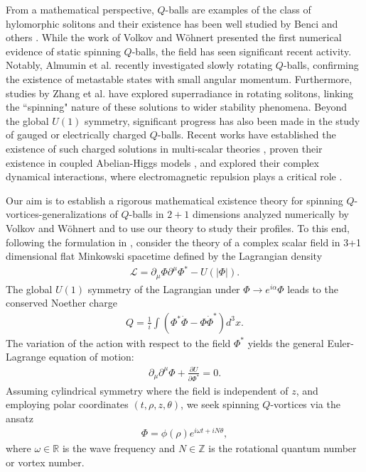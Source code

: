 \documentclass[12pt]{article}
\begin{document}
From a mathematical perspective, $Q$-balls are examples of the class of hylomorphic solitons and their existence has been well studied by Benci and others \cite{Benci3,Benci4,Benci5}. While the work of Volkov and W\"ohnert \cite{VW} presented the first numerical evidence of static spinning $Q$-balls, the field has seen significant recent activity. Notably, Almumin et al. \cite{Almumin2024} recently investigated slowly rotating $Q$-balls, confirming the existence of metastable states with small angular momentum. Furthermore, studies by Zhang et al. \cite{Zhang2025} have explored superradiance in rotating solitons, linking the ``spinning" nature of these solutions to wider stability phenomena. Beyond the global $U(1)$ symmetry, significant progress has also been made in the study of gauged or electrically charged $Q$-balls. Recent works have established the existence of such charged solutions in multi-scalar theories \cite{Brihaye2024}, proven their existence in coupled Abelian-Higgs models \cite{SuHan2025}, and explored their complex dynamical interactions, where electromagnetic repulsion plays a critical role \cite{GaugedCollisions2024}.

Our aim is to establish a rigorous mathematical existence theory for spinning $Q$-vortices-generalizations of $Q$-balls in $2+1$ dimensions analyzed numerically by Volkov and W\"ohnert \cite{VW} and to use our theory to study their profiles. To this end, following the formulation in \cite{VW}, consider the theory of a complex scalar field in 3+1 dimensional flat Minkowski spacetime defined by the Lagrangian density
\begin{align}
    \mathcal{L}=\partial_{\mu}\Phi\partial^{\mu}\Phi^*-U(|\Phi|).\label{theory}
\end{align}
The global $U(1)$ symmetry of the Lagrangian under $\Phi \to e^{i\alpha}\Phi$ leads to the conserved Noether charge
\begin{align}
    Q = \frac{1}{i} \int (\Phi^* \dot{\Phi} - \Phi \dot{\Phi}^*) d^3x. \label{NoetherCharge}
\end{align}
The variation of the action with respect to the field $\Phi^*$ yields the general Euler-Lagrange equation of motion:
\begin{align}
    \partial_{\mu}\partial^{\mu}\Phi + \frac{\partial U}{\partial \Phi^*} = 0. \label{fieldEq}
\end{align}
Assuming cylindrical symmetry where the field is independent of $z$, and employing polar coordinates $(t,\rho,z,\theta)$, we seek spinning $Q$-vortices via the ansatz
\begin{align}
    \Phi=\phi(\rho)e^{i\omega t+iN\theta},\label{ansazts}
\end{align}
where $\omega\in\mathbb{R}$ is the wave frequency and $N\in\mathbb{Z}$ is the rotational quantum number or vortex number.
\end{document}
